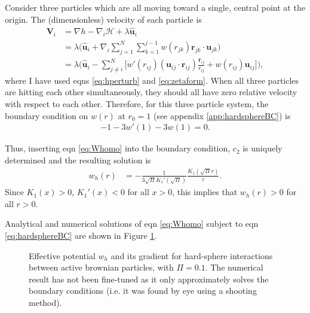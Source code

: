 \documentclass[twocolumn,amsmath,amssymb,aps]{revtex4-1}%
\begin{document}
Consider three particles which are all moving toward a single, central point at
the origin.
The (dimensionless) velocity of each particle is
\begin{align}\label{eq:3hardspherevelocities}
  \bm{V}_i
  &=\nabla h -\nabla_i\mathcal{H} + \lambda \bm{\hat{u}}_i\nonumber\\
  &=\lambda \bigg(\bm{\hat{u}}_i+\nabla_i\sum_{j=1}^N\sum_{k=1}^{j-1}w(r_{jk})
  \bm{r}_{jk}\cdot\bm{u}_{jk}\bigg)\nonumber\\
  &=\lambda \bigg(\bm{\hat{u}}_i-\sum_{j\neq i}^N \bigg[w'(r_{ij})
    (\bm{u}_{ij}\cdot\bm{r}_{ij})\frac{\bm{r}_{ij}}{r_{ij}}
    +w(r_{ij})\bm{u}_{ij}\bigg]\bigg),
\end{align}
where I have used eqns \ref{eq:hperturb} and \ref{eq:zetaform}. When all three
particles are hitting each other simultaneously, they should all have zero
relative velocity with respect to each other. Therefore, for this three
particle system, the boundary condition on $w(r)$ at $r_0=1$ (see appendix
\ref{app:hardsphereBC}) is
\begin{align}\label{eq:hardsphereBC}
  -1-3w'(1)-3w(1)=0.
\end{align}


Thus, inserting eqn \ref{eq:Whomo} into the boundary condition, $c_2$ is
uniquely determined and the resulting solution is
\begin{align}
  w_h(r) &= -\frac{1}{3\sqrt{\Pi}K_1'(\sqrt{\Pi})}\frac{K_1(\sqrt{\Pi}r)}{r}.
\end{align}
Since $K_1(x)>0$, $K_1'(x)<0$ for all $x>0$, this implies that $w_h(r)>0$
for all $r>0$.

Analytical and numerical solutions of eqn \ref{eq:Whomo} subject to eqn
\ref{eq:hardsphereBC} are shown in Figure \ref{fig:1}.

\begin{figure}[!t]
  \subfloat{\label{fig:1b}}
  \caption{\protect{} Effective potential $w_h$ and
    \protect{} its gradient for hard-sphere interactions between
    active brownian particles, with $\Pi=0.1$. The numerical result has not
    been fine-tuned as it only approximately solves the boundary conditions
    (i.e. it was found by eye using a shooting method).}\label{fig:1}
\end{figure}
\end{document}
